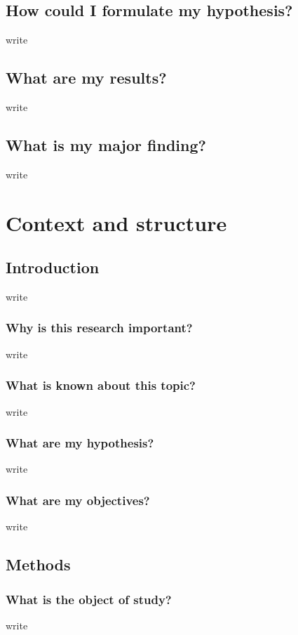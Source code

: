 \documentclass[10pt,a4paper]{article}
\begin{document}
	    \subsection{How could I formulate my hypothesis?}
	    write
	    \subsection{What are my results?}
	    write
	    \subsection{What is my major finding?}
	    write

    \section{Context and structure}
        \subsection{Introduction}
	    write

        \subsubsection{Why is this research important?}
	    write

        \subsubsection{What is known about this topic?}
	    write

        \subsubsection{What are my hypothesis?}
	    write

        \subsubsection{What are my objectives?}
	    write

        \subsection{Methods}
        \subsubsection{What is the object of study?}
	    write
\end{document}
